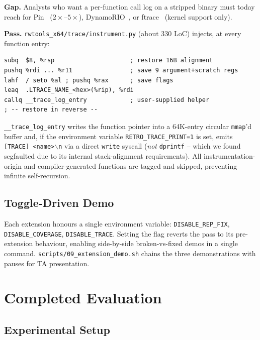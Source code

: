 \documentclass[10pt,a4paper]{article}
\begin{document}
\textbf{Gap.} Analysts who want a per-function call log on a stripped binary
must today reach for Pin~\cite{pin} ($2\times$--$5\times$),
DynamoRIO~\cite{dynamorio}, or ftrace~\cite{ftrace} (kernel support only).

\textbf{Pass.} \texttt{rwtools\_x64/trace/instrument.py} (about 330 LoC)
injects, at every function entry:

\begin{lstlisting}[language={[x86masm]Assembler}]
subq  $8, %rsp                     ; restore 16B alignment
pushq %rdi ... %r11                ; save 9 argument+scratch regs
lahf  / seto %al ; pushq %rax      ; save flags
leaq  .LTRACE_NAME_<hex>(%rip), %rdi
callq __trace_log_entry            ; user-supplied helper
; -- restore in reverse --
\end{lstlisting}

\texttt{\_\_trace\_log\_entry} writes the function pointer into a 64K-entry
circular \texttt{mmap}'d buffer and, if the environment variable
\texttt{RETRO\_TRACE\_PRINT=1} is set, emits \texttt{[TRACE] <name>$\backslash$n} via a
direct \texttt{write} syscall (\emph{not} \texttt{dprintf} -- which we found
segfaulted due to its internal stack-alignment requirements). All
instrumentation-origin and compiler-generated functions are tagged and
skipped, preventing infinite self-recursion.

\subsection{Toggle-Driven Demo}

Each extension honours a single environment variable:
\texttt{DISABLE\_REP\_FIX}, \texttt{DISABLE\_COVERAGE},
\texttt{DISABLE\_TRACE}. Setting the flag reverts the pass to its
pre-extension behaviour, enabling side-by-side broken-vs-fixed demos in a
single command. \texttt{scripts/09\_extension\_demo.sh} chains the three
demonstrations with pauses for TA presentation.

\section{Completed Evaluation}

\subsection{Experimental Setup}
\end{document}
